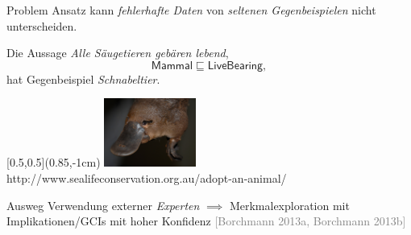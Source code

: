 \documentclass[ngerman]{beamer}
\newcommand{\pseudocite}[1]{\textcolor{gray}{[#1]}}
\begin{document}
\begin{frame}

  \onslide<+->

  \begin{block}{Problem}
    Ansatz kann \emph{fehlerhafte Daten} von \emph{seltenen Gegenbeispielen} nicht
    unterscheiden.
  \end{block}

  \onslide<+->

  \begin{Beispiel}
    Die Aussage \emph{Alle Säugetieren gebären lebend},
    \begin{equation*}
      \mathsf{Mammal} \sqsubseteq \mathsf{LiveBearing},
    \end{equation*}
    \onslide<+->
    hat Gegenbeispiel \emph{Schnabeltier}.
  
    \begin{textblock*}{\linewidth}[0.5,0.5](0.85\linewidth,-1cm)
      \centering
      \includegraphics[width=3cm]{platypus}\\[-2ex]
      {\fontsize{3pt}{4pt}\selectfont http://www.sealifeconservation.org.au/adopt-an-animal/}
    \end{textblock*}

  \end{Beispiel}

  \onslide<+->

  \begin{block}{Ausweg}
    Verwendung externer \emph{Experten}%
    \onslide<+->%
    $\implies$ Merkmalexploration mit Implikationen/GCIs mit hoher Konfidenz
    \pseudocite{Borchmann 2013a, Borchmann 2013b}
  \end{block}

\end{frame}


\end{document}
